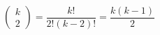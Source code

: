 

\[
\left( \begin{array}{c} k \\ 2 \end{array} \right) = \frac{k!} {2!(k-2)!} = \frac{k(k-1)}{2}
\]



